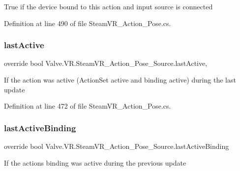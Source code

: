 True if the device bound to this action and input source is connected 



Definition at line 490 of file Steam\+V\+R\+\_\+\+Action\+\_\+\+Pose.\+cs.

\mbox{\label{class_valve_1_1_v_r_1_1_steam_v_r___action___pose___source_a120e4ed1bbaf248457fcaade042ce96d}} 
\subsubsection{\texorpdfstring{lastActive}{lastActive}}
{\footnotesize\ttfamily override bool Valve.\+V\+R.\+Steam\+V\+R\+\_\+\+Action\+\_\+\+Pose\+\_\+\+Source.\+last\+Active\hspace{0.3cm}{\ttfamily [get]}, {}}



If the action was active (Action\+Set active and binding active) during the last update 



Definition at line 472 of file Steam\+V\+R\+\_\+\+Action\+\_\+\+Pose.\+cs.

\mbox{\label{class_valve_1_1_v_r_1_1_steam_v_r___action___pose___source_a3b73993862a63aafd1fceba531af6300}} 
\subsubsection{\texorpdfstring{lastActiveBinding}{lastActiveBinding}}
{\footnotesize\ttfamily override bool Valve.\+V\+R.\+Steam\+V\+R\+\_\+\+Action\+\_\+\+Pose\+\_\+\+Source.\+last\+Active\+Binding\hspace{0.3cm}{\ttfamily [get]}}



If the action\textquotesingle{}s binding was active during the previous update 



